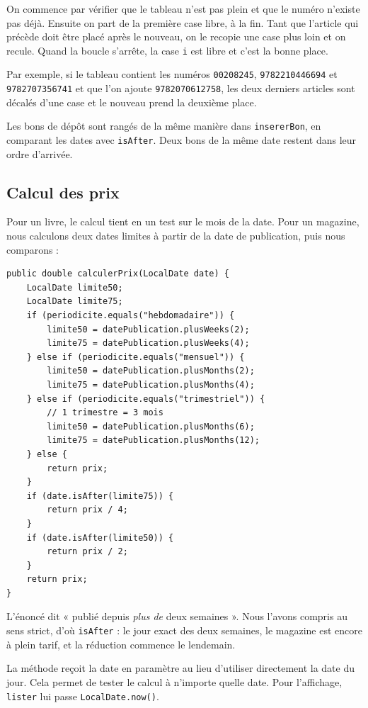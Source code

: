 \documentclass[11pt,a4paper]{article}
\newcommand{\code}[1]{\texttt{#1}}
\begin{document}
On commence par vérifier que le tableau n'est pas plein et que le numéro n'existe pas déjà. Ensuite
on part de la première case libre, à la fin. Tant que l'article qui précède doit être placé après
le nouveau, on le recopie une case plus loin et on recule. Quand la boucle s'arrête, la case
\code{i} est libre et c'est la bonne place.

Par exemple, si le tableau contient les numéros \code{00208245}, \code{9782210446694} et
\code{9782707356741} et que l'on ajoute \code{9782070612758}, les deux derniers articles sont
décalés d'une case et le nouveau prend la deuxième place.

Les bons de dépôt sont rangés de la même manière dans \code{insererBon}, en comparant les dates
avec \code{isAfter}. Deux bons de la même date restent dans leur ordre d'arrivée.

\subsection{Calcul des prix}

Pour un livre, le calcul tient en un test sur le mois de la date. Pour un magazine, nous calculons
deux dates limites à partir de la date de publication, puis nous comparons :

\begin{lstlisting}
public double calculerPrix(LocalDate date) {
    LocalDate limite50;
    LocalDate limite75;
    if (periodicite.equals("hebdomadaire")) {
        limite50 = datePublication.plusWeeks(2);
        limite75 = datePublication.plusWeeks(4);
    } else if (periodicite.equals("mensuel")) {
        limite50 = datePublication.plusMonths(2);
        limite75 = datePublication.plusMonths(4);
    } else if (periodicite.equals("trimestriel")) {
        // 1 trimestre = 3 mois
        limite50 = datePublication.plusMonths(6);
        limite75 = datePublication.plusMonths(12);
    } else {
        return prix;
    }
    if (date.isAfter(limite75)) {
        return prix / 4;
    }
    if (date.isAfter(limite50)) {
        return prix / 2;
    }
    return prix;
}
\end{lstlisting}

L'énoncé dit « publié depuis \emph{plus de} deux semaines ». Nous l'avons compris au sens strict,
d'où \code{isAfter} : le jour exact des deux semaines, le magazine est encore à plein tarif, et la
réduction commence le lendemain.

La méthode reçoit la date en paramètre au lieu d'utiliser directement la date du jour. Cela permet
de tester le calcul à n'importe quelle date. Pour l'affichage, \code{lister} lui passe
\code{LocalDate.now()}.
\end{document}
